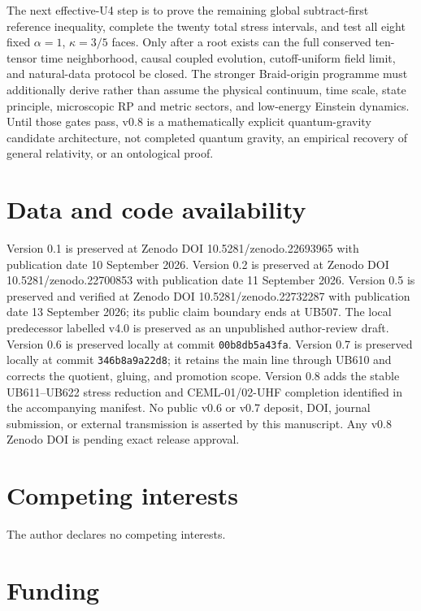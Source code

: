 \documentclass[11pt]{article}
\theoremstyle{definition}
\theoremstyle{remark}
\begin{document}
The next effective-U4 step is to prove the remaining global subtract-first reference inequality, complete the twenty total stress intervals, and test all eight fixed $\alpha=1$, $\kappa=3/5$ faces. Only after a root exists can the full conserved ten-tensor time neighborhood, causal coupled evolution, cutoff-uniform field limit, and natural-data protocol be closed. The stronger Braid-origin programme must additionally derive rather than assume the physical continuum, time scale, state principle, microscopic RP and metric sectors, and low-energy Einstein dynamics. Until those gates pass, v0.8 is a mathematically explicit quantum-gravity candidate architecture, not completed quantum gravity, an empirical recovery of general relativity, or an ontological proof.

\section*{Data and code availability}

Version 0.1 is preserved at Zenodo DOI 10.5281/zenodo.22693965 with publication date 10 September 2026. Version 0.2 is preserved at Zenodo DOI 10.5281/zenodo.22700853 with publication date 11 September 2026. Version 0.5 is preserved and verified at Zenodo DOI 10.5281/zenodo.22732287 with publication date 13 September 2026; its public claim boundary ends at UB507. The local predecessor labelled v4.0 is preserved as an unpublished author-review draft. Version 0.6 is preserved locally at commit \texttt{00b8db5a43fa}. Version 0.7 is preserved locally at commit \texttt{346b8a9a22d8}; it retains the main line through UB610 and corrects the quotient, gluing, and promotion scope. Version 0.8 adds the stable UB611--UB622 stress reduction and CEML-01/02-UHF completion identified in the accompanying manifest. No public v0.6 or v0.7 deposit, DOI, journal submission, or external transmission is asserted by this manuscript. Any v0.8 Zenodo DOI is pending exact release approval.

\section*{Competing interests}

The author declares no competing interests.

\section*{Funding}
\end{document}
